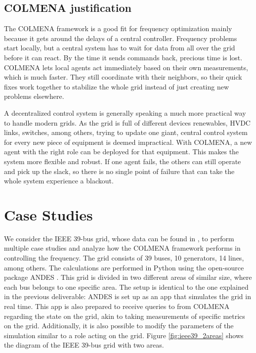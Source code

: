 \documentclass{article}
\begin{document}
\subsection{COLMENA justification}
The COLMENA framework is a good fit for frequency optimization mainly because it gets around the delays of a central controller. Frequency problems start locally, but a central system has to wait for data from all over the grid before it can react. By the time it sends commands back, precious time is lost. COLMENA lets local agents act immediately based on their own measurements, which is much faster. They still coordinate with their neighbors, so their quick fixes work together to stabilize the whole grid instead of just creating new problems elsewhere.

A decentralized control system is generally speaking a much more practical way to handle modern grids. As the grid is full of different devices renewables, HVDC links, switches, among others, trying to update one giant, central control system for every new piece of equipment is deemed impractical. With COLMENA, a new agent with the right role can be deployed for that equipment. This makes the system more flexible and robust. If one agent fails, the others can still operate and pick up the slack, so there is no single point of failure that can take the whole system experience a blackout. 

\newpage
\section{Case Studies}

We consider the IEEE 39-bus grid, whose data can be found in \cite{grids:ieee39}, to perform multiple case studies and analyze how the COLMENA framework performs in controlling the frequency. The grid consists of 39 buses, 10 generators, 14 lines, among others. The calculations are performed in Python using the open-source package ANDES \cite{grids:models}. This grid is divided in two different areas of similar size, where each bus belongs to one specific area. The setup is identical to the one explained in the previous deliverable: ANDES is set up as an app that simulates the grid in real time. This app is also prepared to receive queries to from COLMENA regarding the state on the grid, akin to taking measurements of specific metrics on the grid. Additionally, it is also possible to modify the parameters of the simulation similar to a role acting on the grid. Figure \ref{fig:ieee39_2areas} shows the diagram of the IEEE 39-bus grid with two areas.
\end{document}
